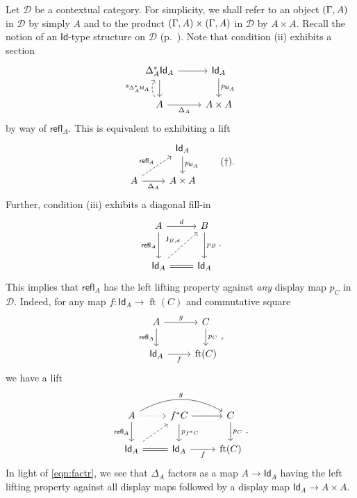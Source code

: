 \documentclass[10pt,letterpaper,cm]{nupset}
\theoremstyle{definition}
\theoremstyle{theorem}
\theoremstyle{remark}
\DeclareMathOperator{\ft}{ft}
\newcommand{\J}{\mathsf{J}}
\newcommand{\id}{\mathsf{Id}}
\newcommand{\refl}{\mathsf{refl}}
\newcommand{\0}{\mathbf{0}}
\newcommand{\1}{\mathbf{1}}
\newcommand{\2}{\mathbf{2}}
\renewcommand{\d}{\mathscr{D}}
\begin{document}
Let $\d$ be a contextual category. For simplicity, we shall refer to an object $\mleft(\Gamma, A\mright)$ in $\d$ by simply $A$ and to the product $\mleft(\Gamma, A\mright) \times \mleft(\Gamma, A\mright)$ in $\d$ by $A \times A$. Recall the notion of an $\id$-type structure on $\d$ (p.~\pageref{idtype}).  Note that condition (ii) exhibits a section
\[
\begin{tikzcd}
\Delta_A^{\ast}{\id_A} \arrow[d] \arrow[r]                                        & \id_A \arrow[d, "p_{\id_A}"] \\
A \arrow[r, "\Delta_A"'] \arrow[u, "s_{\Delta_A^{\ast}\id_A}", dashed, bend left] & A \times A                  
\end{tikzcd}
\] by way of $\refl_A$. This is equivalent to exhibiting a lift
\[
\label{eqn:factr}\begin{tikzcd}
                                                       & \id_A \arrow[d, "p_{\id_A}"] \\
A \arrow[r, "\Delta_A"'] \arrow[ru, "\refl_A", dashed] & A \times A                  
\end{tikzcd} \tag{$\dagger$}
.\] Further, condition (iii) exhibits a diagonal fill-in 
\[
\begin{tikzcd}[row sep=large]
A \arrow[r, "d"] \arrow[d, "\refl_A"']           & B \arrow[d, "p_B"] \\
\id_A \arrow[r, equal] \arrow[ru, "{\J_{B,d}}", dashed] & \id_A             
\end{tikzcd}.
\] This implies that $\refl_A$ has the left lifting property against \emph{any} display map $p_C$ in $\d$. Indeed, for any map $f: \id_A \to \ft(C)$ and commutative square
\[
\begin{tikzcd}
A \arrow[d, "\refl_A"'] \arrow[r, "g"] & C \arrow[d, "p_C"] \\
\id_A \arrow[r, "f"']             & \ft(C)            
\end{tikzcd}
,\] we have a lift 
\[
\begin{tikzcd}
A \arrow[r, dotted] \arrow[d, "\refl_A"'] \arrow[rr, "g", bend left] & f^{\ast}{C} \arrow[r] \arrow[d, "p_{f^{\ast}{C}}"] & C \arrow[d, "p_C"] \\
\id_A \arrow[r, equal] \arrow[ru, dashed]                                   & \id_A \arrow[r, "f"']                              & \ft(C)            
\end{tikzcd}.
\] In light of \eqref{eqn:factr},  we see that $\Delta_A$ factors as a map $A \to \id_A$ having the left lifting property against all display maps followed by a display map $ \id_A \to A\times A$. 
\end{document}
